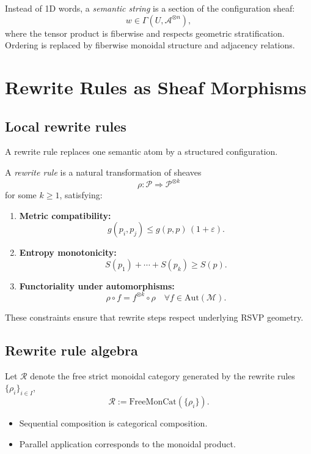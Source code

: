 Instead of 1D words, a \emph{semantic string} is a section of the configuration
sheaf:
\[
w \in \Gamma(U, \mathcal{A}^{\otimes n}),
\]
where the tensor product is fiberwise and respects geometric stratification.
Ordering is replaced by fiberwise monoidal structure and adjacency relations.

\section{Rewrite Rules as Sheaf Morphisms}

\subsection{Local rewrite rules}

A rewrite rule replaces one semantic atom by a structured configuration.

\begin{definition}
A \emph{rewrite rule} is a natural transformation of sheaves
\[
\rho : \mathscr{P} \Longrightarrow \mathscr{P}^{\otimes k}
\]
for some $k\ge 1$, satisfying:
\begin{enumerate}
  \item \textbf{Metric compatibility:}
  \[
  g(p_i,p_j) \le g(p,p)\,(1+\varepsilon).
  \]
  \item \textbf{Entropy monotonicity:}
  \[
  S(p_1)+\cdots+S(p_k)\ge S(p).
  \]
  \item \textbf{Functoriality under automorphisms:}
  \[
  \rho\circ f = f^{\otimes k}\circ\rho
  \quad \forall f\in\mathrm{Aut}(\mathcal{M}).
  \]
\end{enumerate}
\end{definition}

These constraints ensure that rewrite steps respect underlying RSVP geometry.

\subsection{Rewrite rule algebra}

Let $\mathcal{R}$ denote the free strict monoidal category generated by the
rewrite rules $\{\rho_i\}_{i\in I}$,
\[
\mathcal{R} := \mathrm{FreeMonCat}(\{\rho_i\}).
\]

\begin{itemize}
  \item Sequential composition is categorical composition.
  \item Parallel application corresponds to the monoidal product.
\end{itemize}

